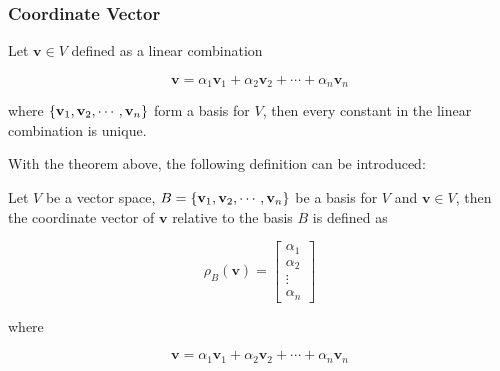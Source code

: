 \documentclass[a4paper,12pt]{article}
\begin{document}
\subsubsection{Coordinate Vector}
\begin{thm}
  Let $\mathbf{v}\in V$ defined as a linear combination

  $$\mathbf{v}=\alpha_{1}\mathbf{v}_{1}+\alpha_{2}\mathbf{v}_{2}+\cdots+\alpha_{n}\mathbf{v}_{n}$$\s

  where $\left\{ \mathbf{v}_{1},\mathbf{v}_{2},\cdots,\mathbf{v}_{n}\right\}$ form a basis for $V$, then every constant in the linear combination is unique.
\end{thm}\n

With the theorem above, the following definition can be introduced:\n

\begin{dft}
  Let $V$ be a vector space, $B=\left\{ \mathbf{v}_{1},\mathbf{v}_{2},\cdots,\mathbf{v}_{n}\right\}$ be a basis for $V$ and $\mathbf{v}\in V$, then the coordinate vector of $\mathbf{v}$ relative to the basis $B$ is defined as

  $$\rho_{B}(\mathbf{v})=\begin{bmatrix}
    \alpha_{1}\\
    \alpha_{2}\\
    \vdots\\
    \alpha_{n}
  \end{bmatrix}$$\s

  where
  
  $$\mathbf{v}=\alpha_{1}\mathbf{v}_{1}+\alpha_{2}\mathbf{v}_{2}+\cdots+\alpha_{n}\mathbf{v}_{n}$$\s
\end{dft}\n
\end{document}
